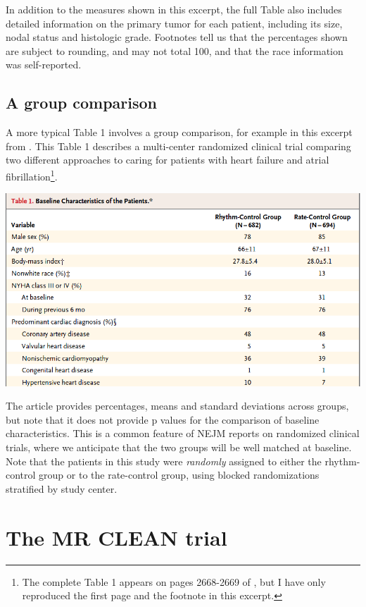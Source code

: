\documentclass[]{book}
\let\rmarkdownfootnote\footnote%
\def\footnote{\protect\rmarkdownfootnote}
\theoremstyle{definition}
\theoremstyle{definition}
\theoremstyle{definition}
\theoremstyle{remark}
\begin{document}
In addition to the measures shown in this excerpt, the full Table also
includes detailed information on the primary tumor for each patient,
including its size, nodal status and histologic grade. Footnotes tell us
that the percentages shown are subject to rounding, and may not total
100, and that the race information was self-reported.

\subsection{A group comparison}\label{a-group-comparison}

A more typical Table 1 involves a group comparison, for example in this
excerpt from \citet{Roy2008}. This Table 1 describes a multi-center
randomized clinical trial comparing two different approaches to caring
for patients with heart failure and atrial fibrillation\footnote{The
  complete Table 1 appears on pages 2668-2669 of \citet{Roy2008}, but I
  have only reproduced the first page and the footnote in this excerpt.}.

\includegraphics[width=0.9\linewidth]{images/Roy-snip1}

The article provides percentages, means and standard deviations across
groups, but note that it does not provide p values for the comparison of
baseline characteristics. This is a common feature of NEJM reports on
randomized clinical trials, where we anticipate that the two groups will
be well matched at baseline. Note that the patients in this study were
\emph{randomly} assigned to either the rhythm-control group or to the
rate-control group, using blocked randomizations stratified by study
center.

\section{The MR CLEAN trial}\label{the-mr-clean-trial}
\end{document}
